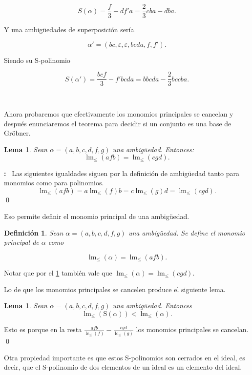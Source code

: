 \documentclass[12pt]{report}
\theoremstyle{customstyle}
\newtheorem{definition}[theorem]{Definición}
\newtheorem{lemma}[theorem]{Lema}
\renewenvironment{proof}[1][\proofname]{{\noindent \bfseries #1: }}{\qed} %
\theoremstyle{factstyle}
\DeclareMathOperator{\lm}{lm}
\DeclareMathOperator{\lc}{lc}
\renewcommand{\S}{\text{S}}
\begin{document}
\[S(α) = \frac{f}{3} - d f' a = \frac{2}{3} cba - dba  \text{.} \]

\noindent Y una ambigüedades de superposición sería

\[ α' = (bc, ε, ε, bcda, f, f') \text{.} \]

\noindent Siendo su S-polinomio

\[ S(α') = \frac{bc f}{3} - f' bcda = bbcda - \frac{2}{3} bccba \text{.} \]

\

Ahora probaremos que efectivamente los monomios principales se cancelan y después enunciaremos el teorema para decidir si un conjunto es una base de Gröbner.

\begin{lemma}\label{lemma:lm ambs}
  Sean $α = (a, b, c, d, f, g)$ una ambigüedad. Entonces:
  \[ \lm_≤{(afb)} = \lm_≤{(cgd)} \text{.}\]
\end{lemma}
\begin{proof}\
  Las siguientes igualdades siguen por la definición de ambigüedad tanto para monomios como para polinomios.
  \[ \lm_≤{(afb)} = a\lm_≤{(f)}b = c\lm_≤{(g)}d = \lm_≤{(cgd)} \text{.} \]
\end{proof}

Eso permite definir el monomio principal de una ambigüedad.

\begin{definition}
  Sean $α = (a, b, c, d, f, g)$ una ambigüedad. Se define el monomio principal de $α$ como

  \[ \lm_≤(α) = \lm_≤(afb) \text{.}\]
\end{definition}

Notar que por el \cref{lemma:lm ambs} también vale que $\lm_≤(α) = \lm_≤(cgd)$.

Lo de que los monomios principales se cancelen produce el siguiente lema.

\begin{lemma}
  Sean $α = (a, b, c, d, f, g)$ una ambigüedad. Entonces
  \[ \lm_≤(\S(α)) < \lm_≤(α) \text{.}\]
\end{lemma}
\begin{proof}
  Esto es porque en la resta $\frac{afb}{\lc_≤(f)} - \frac{cgd}{\lc_≤(g)}$ los monomios principales se cancelan.
\end{proof}

Otra propiedad importante es que estos S-polinomios son cerrados en el ideal, es decir, que el S-polinomio de dos elementos de un ideal es un elemento del ideal.
\end{document}
